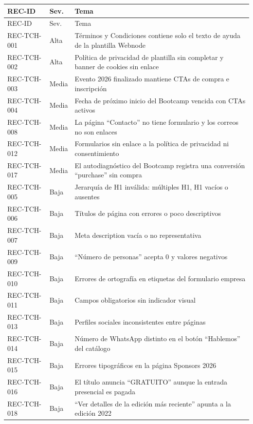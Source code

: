 \documentclass[11pt,a4paper]{article}
\begin{document}
{\footnotesize
\begin{longtable}{@{}l l >{\raggedright\arraybackslash}p{}@{}}
\toprule
REC-ID & Sev. & Tema \\
\midrule
\endfirsthead
\toprule
REC-ID & Sev. & Tema \\
\midrule
\endhead
\bottomrule
\endfoot
REC-TCH-001 & Alta & Términos y Condiciones contiene solo el texto de ayuda de la plantilla Webnode \\
REC-TCH-002 & Alta & Política de privacidad de plantilla sin completar y banner de cookies sin enlace \\
REC-TCH-003 & Media & Evento 2026 finalizado mantiene CTAs de compra e inscripción \\
REC-TCH-004 & Media & Fecha de próximo inicio del Bootcamp vencida con CTAs activos \\
REC-TCH-008 & Media & La página ``Contacto'' no tiene formulario y los correos no son enlaces \\
REC-TCH-012 & Media & Formularios sin enlace a la política de privacidad ni consentimiento \\
REC-TCH-017 & Media & El autodiagnóstico del Bootcamp registra una conversión ``purchase'' sin compra \\
REC-TCH-005 & Baja & Jerarquía de H1 inválida: múltiples H1, H1 vacíos o ausentes \\
REC-TCH-006 & Baja & Títulos de página con errores o poco descriptivos \\
REC-TCH-007 & Baja & Meta description vacía o no representativa \\
REC-TCH-009 & Baja & ``Número de personas'' acepta 0 y valores negativos \\
REC-TCH-010 & Baja & Errores de ortografía en etiquetas del formulario empresa \\
REC-TCH-011 & Baja & Campos obligatorios sin indicador visual \\
REC-TCH-013 & Baja & Perfiles sociales inconsistentes entre páginas \\
REC-TCH-014 & Baja & Número de WhatsApp distinto en el botón ``Hablemos'' del catálogo \\
REC-TCH-015 & Baja & Errores tipográficos en la página Sponsors 2026 \\
REC-TCH-016 & Baja & El título anuncia ``GRATUITO'' aunque la entrada presencial es pagada \\
REC-TCH-018 & Baja & ``Ver detalles de la edición más reciente'' apunta a la edición 2022 \\
\end{longtable}}
\end{document}
